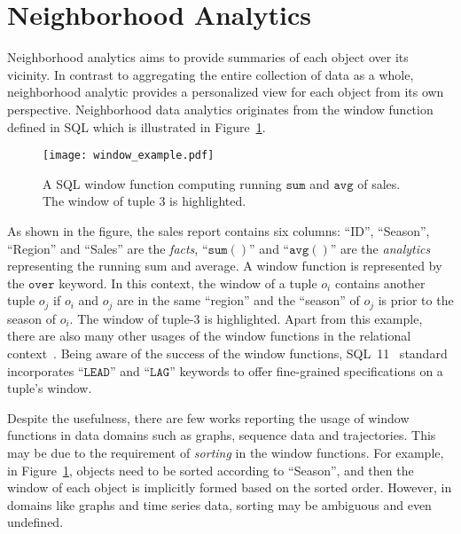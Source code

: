 \section{Neighborhood Analytics}
Neighborhood analytics aims to provide
summaries of each object over its vicinity. In contrast to aggregating the entire collection of data as a whole, neighborhood
analytic provides a personalized view for each object from its own perspective. Neighborhood
data analytics originates from the window function defined in SQL which is
illustrated in Figure~\ref{fig:window}.

\begin{figure}[h]
\centering
\texttt{[image: window\_example.pdf]}
\caption{A SQL window function computing running $\mathtt{sum}$ and $\mathtt{avg}$ of
sales. The window of tuple 3 is highlighted.} 
\label{fig:window}
\end{figure}

As shown in the figure, the sales report contains six columns: ``ID'',
``Season'', ``Region'' and ``Sales'' are the \emph{facts}, ``$\mathtt{sum()}$'' and ``$\mathtt{avg()}$''
are the \emph{analytics} representing the running sum and average. A window function
is represented by the $\mathtt{over}$ keyword. In this context, the window of a tuple $o_i$
contains another tuple $o_j$ if $o_i$ and $o_j$ are in the same ``region'' and the ``season'' of $o_j$ is
prior to the season of $o_i$. The window of tuple-$3$ is highlighted.
Apart from this example, there are also many other 
usages of the window functions in the relational context~\cite{cao2012optimization}. 
Being aware of the success of the window functions, 
SQL~11~\cite{zemke2012s} standard incorporates ``$\mathtt{LEAD}$'' and ``$\mathtt{LAG}$'' 
keywords to offer fine-grained specifications on a tuple's window.

Despite the usefulness, there are few works reporting
the usage of window functions in data domains such as graphs, sequence data and trajectories.
This may be due to the
requirement of \emph{sorting} in the window functions. For example,
in Figure~\ref{fig:window},
objects need to be sorted according to ``Season'', and then the window of  
each object is implicitly formed based on the sorted order. However, 
in domains like graphs and time series data, sorting may be ambiguous and even undefined.

